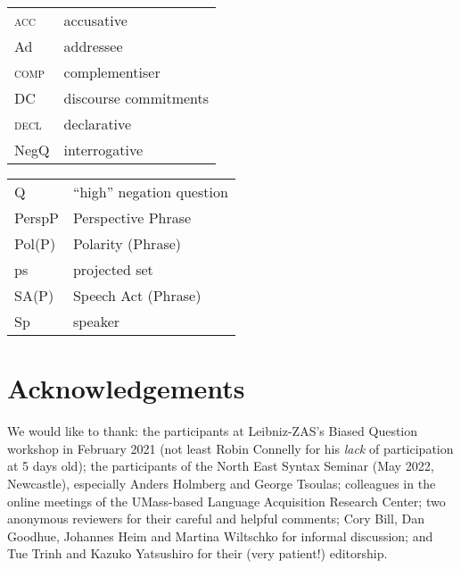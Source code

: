\documentclass[output=paper,colorlinks,citecolor=brown]{langscibook}
\begin{document}
\begin{tabularx} {.45\textwidth}{lQ}
\textsc{acc}   &   accusative \\
Ad              &  addressee \\
\textsc{comp}   &  complementiser \\
DC             &   discourse commitments \\
\textsc{decl}  &   declarative \\
NegQ   &           interrogative \\
\end{tabularx}
\begin{tabularx} {.54\textwidth}{ll}
Q   &              ``high'' negation question \\
PerspP   &         Perspective Phrase \\
Pol(P)   &         Polarity (Phrase) \\
ps   &             projected set \\
SA(P)   &          Speech Act (Phrase) \\
Sp   &             speaker \\
 \end{tabularx}


\section*{Acknowledgements}
We would like to thank: the participants at Leibniz-ZAS's Biased Question workshop in February 2021 (not least Robin Connelly for his \textit{lack} of participation at 5 days old); the participants of the North East Syntax Seminar (May 2022, Newcastle), especially Anders Holmberg and George Tsoulas; colleagues in the online meetings of the UMass-based Language Acquisition Research Center; two anonymous reviewers for their careful and helpful comments; Cory Bill, Dan Goodhue, Johannes Heim and Martina Wiltschko for informal discussion; and Tue Trinh and Kazuko Yatsushiro for their (very patient!) editorship. 
\end{document}
